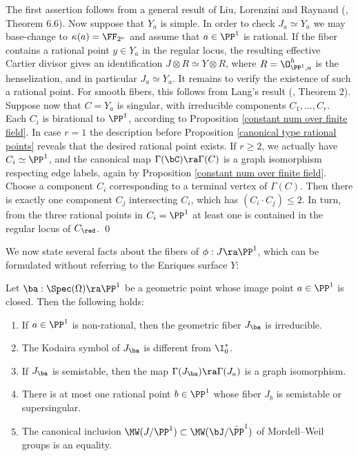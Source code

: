 \proof
The first assertion follows from a general result of Liu, Lorenzini and Raynaud
(\cite{Liu-Lorenzini-Raynaud-2005}, Theorem 6.6). Now suppose that $Y_a$ is simple.
In order to check $J_a\simeq Y_a$ we may base-change to $\kappa(a)=\FF_{2^\nu}$ and assume that $a\in\PP^1$ is rational.
If the fiber contains a rational point $y\in Y_a$ in the regular locus, the resulting
effective Cartier divisor gives an identification $J\otimes R\simeq Y\otimes R$,
where $R=\O_{\PP^1,a}^h$ is the henselization, and in particular $J_a\simeq Y_a$.
It remains  to verify the existence of such a  rational point.
For smooth fibers, this follows from Lang's result (\cite{Lang-1956}, Theorem 2).
Suppose now that $C=Y_a$ is singular, with irreducible components $C_1,\ldots, C_r$.
Each $C_i$ is birational to $\PP^1$, according to Proposition \ref{constant num over finite field}.
In case $r=1$  the description before Proposition \ref{canonical type rational points}
reveals that the desired rational point exists.
If $r\geq 2$, we actually have $C_i\simeq \PP^1$, and
the canonical map $\Gamma(\bC)\ra\Gamma(C)$ is a graph isomorphism respecting edge labels,
again by Proposition \ref{constant num over finite field}.
Choose a component $C_i$ corresponding to a terminal vertex of $\Gamma(C)$. Then there is exactly one
component $C_j$ intersecting $C_i$, which has $(C_i\cdot C_j)\leq 2$.
In turn, from the three rational points in $C_i=\PP^1$ at least one is contained in
the regular locus of $C_\red$.
\qed


We now state   several facts about the fibers of $\phi:J\ra\PP^1$, which can be formulated without referring to the Enriques surface $Y$:
\begin{proposition}
\notready
\label{jacobian fiber properties}
Let $\ba:\Spec(\Omega)\ra \PP^1$ be a geometric point whose image point $a\in \PP^1$ is closed.
Then the following holds:
\begin{enumerate}
\item
\label{non-rational J}
If $a\in \PP^1$ is non-rational, then the geometric fiber $J_\ba$ is irreducible.
\item
\label{I0* J}
The Kodaira symbol of  $J_\ba$ is different from  $\I_0^*$.
\item
\label{semistable J}
If $J_\ba$ is semistable, then  the   map $\Gamma(J_\ba)\ra\Gamma(J_a)$ is a graph isomorphism.
\item
\label{rational J}
There is at most one rational point $b\in\PP^1$ whose fiber $J_b$ is semistable or supersingular.
\item
\label{mw J}
The canonical inclusion $\MW(J/\PP^1)\subset \MW(\bJ/\bar{\PP}^1)$
of Mordell--Weil groups is an equality.
\end{enumerate}
\end{proposition}

